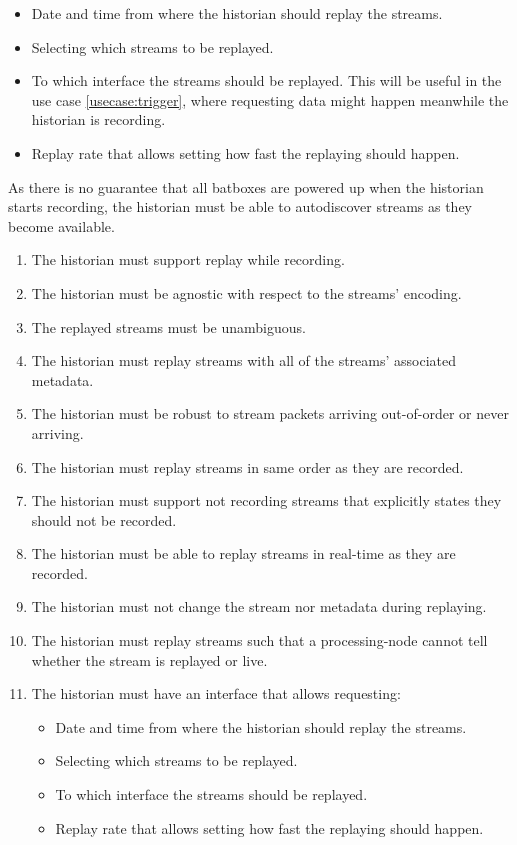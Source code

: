 \begin{itemize}
	\item Date and time from where the historian should replay the streams.
	\item Selecting which streams to be replayed.
	\item To which interface the streams should be replayed. This will be useful in the use case \ref{usecase:trigger}, where requesting data might happen meanwhile the historian is recording.
	\item Replay rate that allows setting how fast the replaying should happen. 
\end{itemize}

As there is no guarantee that all batboxes are powered up when the historian starts recording, the historian must be able to autodiscover streams as they become available.
 

\begin{enumerate}
	\item The historian must support replay while recording.
	\item The historian must be agnostic with respect to the streams' encoding.
	\item The replayed streams must be unambiguous.
	\item The historian must replay streams with all of the streams' associated metadata.
	\item The historian must be robust to stream packets arriving out-of-order or never arriving.
	\item The historian must replay streams in same order as they are recorded.
	\item The historian must support not recording streams that explicitly states they should not be recorded.
	\item The historian must be able to replay streams in real-time as they are recorded.
	\item The historian must not change the stream nor metadata during replaying.
	\item The historian must replay streams such that a processing-node cannot tell whether the stream is replayed or live.
	\item The historian must have an interface that allows requesting:
	\begin{itemize}
		\item Date and time from where the historian should replay the streams.
		\item Selecting which streams to be replayed.
		\item To which interface the streams should be replayed. 
		\item Replay rate that allows setting how fast the replaying should happen. 
	\end{itemize}
\end{enumerate}

